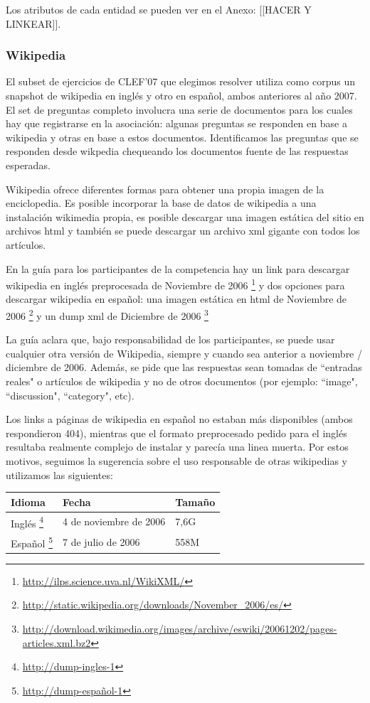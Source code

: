 Los atributos de cada entidad se pueden ver en el Anexo: [[HACER Y LINKEAR]].

\subsubsection{Wikipedia}
El subset de ejercicios de CLEF'07 que elegimos resolver
utiliza como corpus un snapshot de wikipedia en inglés y otro en español,
ambos anteriores al año 2007.
El set de preguntas completo involucra una serie de documentos para los cuales hay que 
registrarse en la asociación: algunas preguntas se responden en base a wikipedia y otras en base a estos documentos.
Identificamos las preguntas que se responden desde wikpedia chequeando los documentos fuente de las respuestas esperadas.

Wikipedia ofrece diferentes formas para obtener una propia imagen de la enciclopedia.
Es posible incorporar la base de datos de wikipedia a una instalación wikimedia
propia, es posible descargar una imagen estática del sitio en archivos html y también se puede
descargar un archivo xml gigante con todos los artículos. 

En la guía para los participantes de la competencia \cite{GuidelineClef07} hay un link para descargar 
wikipedia en inglés preprocesada de Noviembre de 2006 \footnote{\url{http://ilps.science.uva.nl/WikiXML/}} y dos opciones para descargar wikipedia en español: una imagen estática en html de Noviembre de 2006 \footnote{\url{http://static.wikipedia.org/downloads/November_2006/es/}} y un dump xml de Diciembre de 2006 
\footnote{\url{http://download.wikimedia.org/images/archive/eswiki/20061202/pages-articles.xml.bz2}}

La guía aclara que, bajo responsabilidad de los participantes, se puede usar
cualquier otra versión de Wikipedia, siempre y cuando sea anterior a noviembre / diciembre de 2006.
Además, se pide que las respuestas sean tomadas de ``entradas reales" o artículos de wikipedia y
no de otros documentos (por ejemplo: ``image", ``discussion", ``category", etc).

Los links a páginas de wikipedia en español no estaban más disponibles (ambos respondieron 404), mientras que el formato
preprocesado pedido para el inglés resultaba realmente complejo de instalar y parecía una linea muerta. Por estos motivos,
seguimos la sugerencia sobre el uso responsable de otras wikipedias y utilizamos las siguientes:

\medskip

\begin{center}
\begin{tabular}{ | l | l | l |}
    \hline
    Idioma & Fecha & Tamaño\\ \hline
    Inglés \footnote{\url{http://dump-ingles-1}} & 4 de noviembre de 2006 & 7,6G \\ \hline
    Español \footnote{\url{http://dump-español-1}} & 7 de julio de 2006 & 558M \\ \hline
\end{tabular}  
\end{center}

